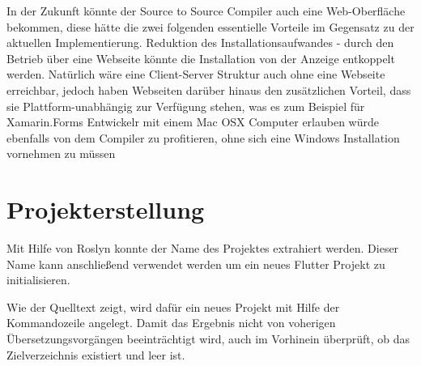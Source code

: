 In der Zukunft könnte der Source to Source Compiler auch eine Web-Oberfläche bekommen,  diese hätte die zwei folgenden essentielle Vorteile im Gegensatz zu der aktuellen Implementierung.  Reduktion des Installationsaufwandes - durch den Betrieb über eine Webseite könnte die Installation von der Anzeige entkoppelt werden.  Natürlich wäre eine Client-Server Struktur auch ohne eine Webseite erreichbar,  jedoch haben Webseiten darüber hinaus den zusätzlichen Vorteil,  dass sie Plattform-unabhängig zur Verfügung stehen,  was es zum Beispiel für Xamarin.Forms Entwickelr mit einem Mac OSX Computer erlauben würde ebenfalls von dem Compiler zu profitieren, ohne sich eine Windows Installation vornehmen zu müssen

\section{Projekterstellung}
Mit Hilfe von Roslyn konnte der Name des Projektes extrahiert werden.  Dieser Name kann anschließend verwendet werden um ein neues Flutter Projekt zu initialisieren.  

Wie der Quelltext zeigt,  wird dafür ein neues Projekt mit Hilfe der Kommandozeile angelegt.  Damit das Ergebnis nicht von voherigen Übersetzungsvorgängen beeinträchtigt wird,  auch im Vorhinein überprüft,  ob das Zielverzeichnis existiert und leer ist. 


